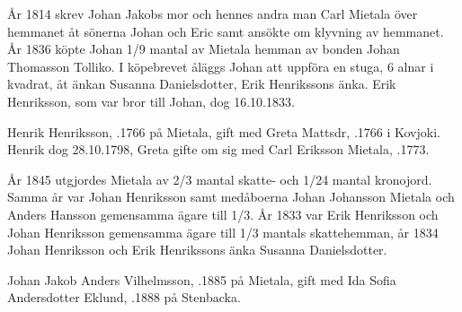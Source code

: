 År 1814 skrev Johan Jakobs mor och hennes andra man Carl Mietala över hemmanet åt sönerna Johan och Eric samt ansökte om klyvning av hemmanet. År 1836 köpte Johan 1/9 mantal av Mietala hemman av bonden Johan Thomasson Tolliko. I köpebrevet åläggs Johan att uppföra en stuga, 6 alnar i kvadrat, åt änkan Susanna Danielsdotter, Erik Henrikssons änka. Erik Henriksson, som var bror till Johan, dog 16.10.1833.


Henrik Henriksson, .1766 på Mietala, gift med Greta Mattsdr, .1766 i Kovjoki. Henrik dog 28.10.1798, Greta gifte om sig med Carl Eriksson Mietala, .1773.
\begin{jhchildren}
  \item {}
  \item {}
  \item {}
  \item {}
  \item {}
  \item {}
  \item {}
\end{jhchildren}

År 1845 utgjordes Mietala av 2/3 mantal skatte- och 1/24 mantal kronojord. Samma år var Johan Henriksson samt medåboerna Johan Johansson Mietala och Anders Hansson gemensamma ägare till 1/3. År 1833 var Erik Henriksson och Johan Henriksson gemensamma ägare till 1/3 mantals skattehemman, år 1834 Johan Henriksson och Erik Henrikssons änka Susanna Danielsdotter.





Johan Jakob Anders Vilhelmsson, .1885 på Mietala, gift med Ida Sofia Andersdotter Eklund, .1888 på Stenbacka.
\begin{jhchildren}
  \item {}
  \item {}
  \item {}
\end{jhchildren}

